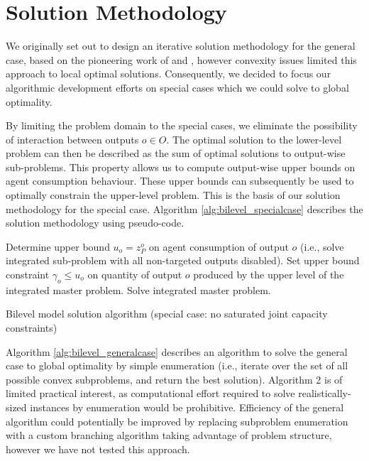 \section{Solution Methodology}

We originally set out to design an iterative solution methodology for the general case, based on the pioneering work of \citet{fortuny1981representation} and \citet{bard1982explicit}, however convexity issues limited this approach to local optimal solutions. 
Consequently, we decided to focus our algorithmic development efforts on special cases which we could solve to global optimality.

By limiting the problem domain to the special cases, we eliminate the possibility of interaction between outputs $o \in O$.
The optimal solution to the lower-level problem can then be described as the sum of optimal solutions to output-wise sub-problems.  
This property allows us to compute output-wise upper bounds on agent consumption behaviour.
These upper bounds can subsequently be used to optimally constrain the upper-level problem.
This is the basis of our solution methodology for the special case.
Algorithm \ref{alg:bilevel_specialcase} describes the solution methodology using pseudo-code.

\vspace{12pt}
\begin{algorithm}[H]
  \DontPrintSemicolon
  \BlankLine
   {
    Determine upper bound $u_o = z_P^o$ on agent consumption of output $o$ (i.e., solve integrated sub-problem with all non-targeted outputs disabled). \;
  }
   {
    Set upper bound constraint $\gamma_o \leq u_o$ on quantity of output $o$ produced by the upper level of the integrated master problem. \;
  }
  Solve integrated master problem. \;
  \caption{Bilevel model solution algorithm (special case: no saturated joint capacity constraints)}
  \label{alg:bilevel_specialcase}
\end{algorithm}
\vspace{12pt}

Algorithm \ref{alg:bilevel_generalcase} describes an algorithm to solve the general case to global optimality by simple enumeration (i.e., iterate over the set of all possible convex subproblems, and return the best solution). Algorithm 2 is of limited practical interest, as computational effort required to solve realistically-sized instances by enumeration would be prohibitive. Efficiency of the general algorithm could potentially be improved by replacing subproblem enumeration with a custom branching algorithm taking advantage of problem structure, however we have not tested this approach.

